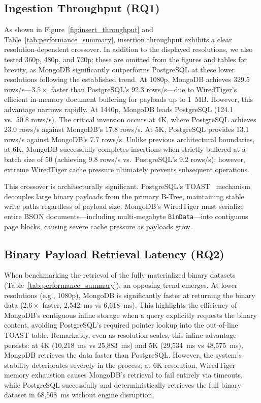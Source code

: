 \documentclass[conference, a4paper]{IEEEtran}
\begin{document}
\subsection{Ingestion Throughput (RQ1)}
\label{subsec:insert_throughput}
As shown in Figure~\ref{fig:insert_throughput} and Table~\ref{tab:performance_summary}, insertion throughput exhibits a clear resolution-dependent crossover. In addition to the displayed resolutions, we also tested 360p, 480p, and 720p; these are omitted from the figures and tables for brevity, as MongoDB significantly outperforms PostgreSQL at these lower resolutions following the established trend. At 1080p, MongoDB achieves 329.5 rows/s---$3.5\times$ faster than PostgreSQL's 92.3 rows/s---due to WiredTiger's efficient in-memory document buffering for payloads up to 1~MB. However, this advantage narrows rapidly. At 1440p, MongoDB leads PostgreSQL (124.1 vs.\ 50.8 rows/s). The critical inversion occurs at 4K, where PostgreSQL achieves 23.0 rows/s against MongoDB's 17.8 rows/s. At 5K, PostgreSQL provides 13.1 rows/s against MongoDB's 7.7 rows/s. Unlike previous architectural boundaries, at 6K, MongoDB successfully completes insertions when strictly buffered at a batch size of 50 (achieving 9.8 rows/s vs.\ PostgreSQL's 9.2 rows/s); however, extreme WiredTiger cache pressure ultimately prevents subsequent operations.

This crossover is architecturally significant. PostgreSQL's TOAST~\cite{postgresql_toast_docs} mechanism decouples large binary payloads from the primary B-Tree, maintaining stable write paths regardless of payload size. MongoDB's WiredTiger must serialize entire BSON documents---including multi-megabyte \texttt{BinData}---into contiguous page blocks, causing severe cache pressure as payloads grow.

\subsection{Binary Payload Retrieval Latency (RQ2)}
\label{subsec:retrieval_latency}
When benchmarking the retrieval of the fully materialized binary datasets (Table~\ref{tab:performance_summary}), an opposing trend emerges. At lower resolutions (e.g., 1080p), MongoDB is significantly faster at returning the binary data ($2.6\times$ faster, 2,542~ms vs 6,618~ms). This highlights the efficiency of MongoDB's contiguous inline storage when a query explicitly requests the binary content, avoiding PostgreSQL's required pointer lookup into the out-of-line TOAST table. Remarkably, even as resolution scales, this inline advantage persists: at 4K (10,218~ms vs 25,883~ms) and 5K (29,534~ms vs 48,575~ms), MongoDB retrieves the data faster than PostgreSQL. However, the system's stability deteriorates severely in the process; at 6K resolution, WiredTiger memory exhaustion causes MongoDB's retrieval to fail entirely via timeouts, while PostgreSQL successfully and deterministically retrieves the full binary dataset in 68,568~ms without engine disruption.
\end{document}
